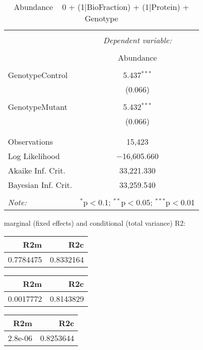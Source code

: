 \documentclass[11pt]{report}
\begin{document}
\begin{table}[!htbp] \centering 
  \caption{Abundance ~ 0 + (1|BioFraction) + (1|Protein) + Genotype} 
  \label{} 
\begin{tabular}{@{\extracolsep{5pt}}lc} 
\\[-1.8ex]\hline 
\hline \\[-1.8ex] 
 & \multicolumn{1}{c}{\textit{Dependent variable:}} \\ 
\cline{2-2} 
\\[-1.8ex] & Abundance \\ 
\hline \\[-1.8ex] 
 GenotypeControl & 5.437$^{***}$ \\ 
  & (0.066) \\ 
  & \\ 
 GenotypeMutant & 5.432$^{***}$ \\ 
  & (0.066) \\ 
  & \\ 
\hline \\[-1.8ex] 
Observations & 15,423 \\ 
Log Likelihood & $-$16,605.660 \\ 
Akaike Inf. Crit. & 33,221.330 \\ 
Bayesian Inf. Crit. & 33,259.540 \\ 
\hline 
\hline \\[-1.8ex] 
\textit{Note:}  & \multicolumn{1}{r}{$^{*}$p$<$0.1; $^{**}$p$<$0.05; $^{***}$p$<$0.01} \\ 
\end{tabular} 
\end{table} 
marginal (fixed effects) and conditional (total variance) R2:

\begin{tabular}{r|r}
\hline
R2m & R2c\\
\hline
0.7784475 & 0.8332164\\
\hline
\end{tabular}

\begin{tabular}{r|r}
\hline
R2m & R2c\\
\hline
0.0017772 & 0.8143829\\
\hline
\end{tabular}

\begin{tabular}{r|r}
\hline
R2m & R2c\\
\hline
2.8e-06 & 0.8253644\\
\hline
\end{tabular}
\end{document}
